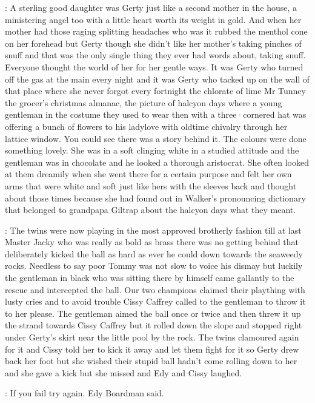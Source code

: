 :
A sterling good daughter was Gerty just like a second mother in the house,
a ministering angel too with a little heart worth its weight in gold.
And when her mother had those raging splitting headaches who was it
rubbed the menthol cone on her forehead but Gerty though she didn't like
her mother's taking pinches of snuff and that was the only single thing
they ever had words about,
taking snuff.
Everyone thought the world of her
for her gentle ways.
It was Gerty who turned off the gas at the main every
night and it was Gerty who tacked up on the wall of that place where she
never forgot every fortnight the chlorate of lime Mr Tunney the grocer's
christmas almanac,
the picture of halcyon days where a young gentleman in
the costume they used to wear then with a three·cornered hat was offering a
bunch of flowers to his ladylove with oldtime chivalry through her lattice
window.
You could see there was a story behind it.
The colours were done
something lovely.
She was in a soft clinging white in a studied attitude
and the gentleman was in chocolate and he looked a thorough aristocrat.
She often looked at them dreamily
when she went there for a certain
purpose and felt her own arms that were white and soft just like hers with
the sleeves back and thought about those times because she had found out
in Walker's pronouncing dictionary that belonged to grandpapa Giltrap
about the halcyon days what they meant.

:
The twins were now playing in the most approved brotherly fashion till at
last Master Jacky who was really as bold as brass there was no getting
behind that deliberately kicked the ball as hard as ever he could down
towards the seaweedy rocks.
Needless to say poor Tommy was not slow to
voice his dismay but luckily the gentleman in black who was sitting there
by himself came gallantly to the rescue
and intercepted the ball.
Our two champions claimed their plaything with lusty cries and to avoid trouble
Cissy Caffrey called to the gentleman to throw it to her please.
The
gentleman aimed the ball once or twice and then threw it up the strand
towards Cissy Caffrey but it rolled down the slope and stopped right under
Gerty's skirt near the little pool by the rock.
The twins clamoured again
for it and Cissy told her to kick it away and let them fight for it so
Gerty drew back her foot but she wished their stupid ball hadn't come
rolling down to her and she gave a kick but she missed and Edy and Cissy
laughed.

\edy:
If you fail try again.
Edy Boardman said.

